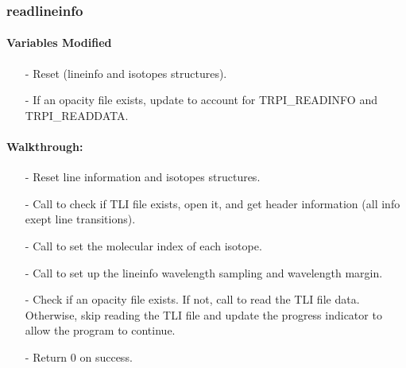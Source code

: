\documentclass[letterpaper,12pt]{article}
\begin{document}
 \newline

 \newline

 \newline

 \newline

 \newline

\subsubsection{readlineinfo}
\paragraph{Variables Modified}
\begin{enumerate}[leftmargin=10pt, noitemsep, parsep=0pt, topsep=0ex]
\item[-] Reset  (lineinfo and
  isotopes structures).
\item[-] If an opacity file exists, update  to account for TRPI\_READINFO and TRPI\_READDATA.
\end{enumerate}

\paragraph{Walkthrough:}
\begin{enumerate}[leftmargin=10pt, noitemsep, parsep=0pt, topsep=0ex]
\item[-] Reset line information and isotopes structures.  
\item[-] Call  to check if TLI file exists, open it, and get header information (all info exept line transitions). 
\item[-] Call  to set the molecular index of each isotope. 
\item[-] Call  to set up the lineinfo wavelength sampling and wavelength margin.
\item[-] Check if an opacity file exists. If not, call  to read the TLI file data. Otherwise, skip reading the TLI file and update the progress indicator to allow the program to continue.
\item[-] Return 0 on success.
\end{enumerate}
\end{document}
